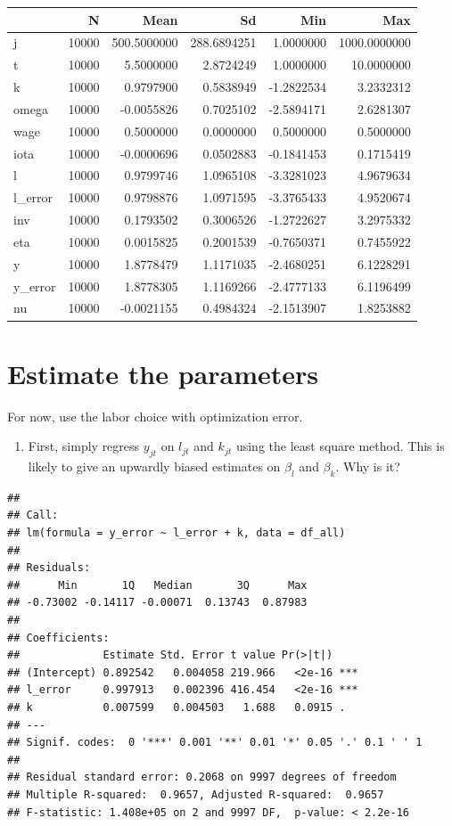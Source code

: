 \documentclass[
]{book}
\providecommand{\tightlist}{%
  \setlength{\itemsep}{0pt}\setlength{\parskip}{0pt}}
\begin{document}
\begin{tabular}{l|r|r|r|r|r}
\hline
  & N & Mean & Sd & Min & Max\\
\hline
j & 10000 & 500.5000000 & 288.6894251 & 1.0000000 & 1000.0000000\\
\hline
t & 10000 & 5.5000000 & 2.8724249 & 1.0000000 & 10.0000000\\
\hline
k & 10000 & 0.9797900 & 0.5838949 & -1.2822534 & 3.2332312\\
\hline
omega & 10000 & -0.0055826 & 0.7025102 & -2.5894171 & 2.6281307\\
\hline
wage & 10000 & 0.5000000 & 0.0000000 & 0.5000000 & 0.5000000\\
\hline
iota & 10000 & -0.0000696 & 0.0502883 & -0.1841453 & 0.1715419\\
\hline
l & 10000 & 0.9799746 & 1.0965108 & -3.3281023 & 4.9679634\\
\hline
l\_error & 10000 & 0.9798876 & 1.0971595 & -3.3765433 & 4.9520674\\
\hline
inv & 10000 & 0.1793502 & 0.3006526 & -1.2722627 & 3.2975332\\
\hline
eta & 10000 & 0.0015825 & 0.2001539 & -0.7650371 & 0.7455922\\
\hline
y & 10000 & 1.8778479 & 1.1171035 & -2.4680251 & 6.1228291\\
\hline
y\_error & 10000 & 1.8778305 & 1.1169266 & -2.4777133 & 6.1196499\\
\hline
nu & 10000 & -0.0021155 & 0.4984324 & -2.1513907 & 1.8253882\\
\hline
\end{tabular}

\hypertarget{estimate-the-parameters}{%
\section{Estimate the parameters}\label{estimate-the-parameters}}

For now, use the labor choice with optimization error.

\begin{enumerate}
\def\labelenumi{\arabic{enumi}.}
\tightlist
\item
  First, simply regress \(y_{jt}\) on \(l_{jt}\) and \(k_{jt}\) using the least square method. This is likely to give an upwardly biased estimates on \(\beta_l\) and \(\beta_k\). Why is it?
\end{enumerate}

\begin{verbatim}
## 
## Call:
## lm(formula = y_error ~ l_error + k, data = df_all)
## 
## Residuals:
##      Min       1Q   Median       3Q      Max 
## -0.73002 -0.14117 -0.00071  0.13743  0.87983 
## 
## Coefficients:
##             Estimate Std. Error t value Pr(>|t|)    
## (Intercept) 0.892542   0.004058 219.966   <2e-16 ***
## l_error     0.997913   0.002396 416.454   <2e-16 ***
## k           0.007599   0.004503   1.688   0.0915 .  
## ---
## Signif. codes:  0 '***' 0.001 '**' 0.01 '*' 0.05 '.' 0.1 ' ' 1
## 
## Residual standard error: 0.2068 on 9997 degrees of freedom
## Multiple R-squared:  0.9657, Adjusted R-squared:  0.9657 
## F-statistic: 1.408e+05 on 2 and 9997 DF,  p-value: < 2.2e-16
\end{verbatim}
\end{document}
